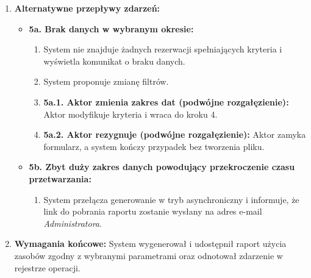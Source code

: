 \documentclass[11pt, a4paper]{article}
\begin{document}
\begin{enumerate}
    \item \textbf{Alternatywne przepływy zdarzeń:}
    \begin{itemize}
        \item \textbf{5a. Brak danych w wybranym okresie:}
        \begin{enumerate}
            \item System nie znajduje żadnych rezerwacji spełniających kryteria i wyświetla komunikat o braku danych.
            \item System proponuje zmianę filtrów.
            \item \textbf{5a.1. Aktor zmienia zakres dat (podwójne rozgałęzienie):} Aktor modyfikuje kryteria i wraca do kroku 4.
            \item \textbf{5a.2. Aktor rezygnuje (podwójne rozgałęzienie):} Aktor zamyka formularz, a system kończy przypadek bez tworzenia pliku.
        \end{enumerate}
        \item \textbf{5b. Zbyt duży zakres danych powodujący przekroczenie czasu przetwarzania:}
        \begin{enumerate}
            \item System przełącza generowanie w tryb asynchroniczny i informuje, że link do pobrania raportu zostanie wysłany na adres e-mail \textit{Administratora}.
        \end{enumerate}
    \end{itemize}
    \item \textbf{Wymagania końcowe:} System wygenerował i udostępnił raport użycia zasobów zgodny z wybranymi parametrami oraz odnotował zdarzenie w rejestrze operacji.
\end{enumerate}
\listoffigures
\newpage
\end{document}
